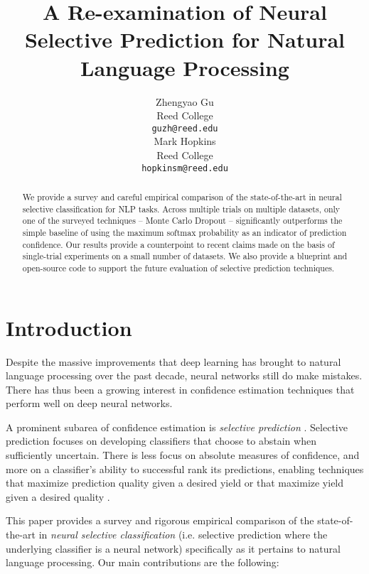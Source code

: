 \documentclass[11pt]{article}
\title{A Re-examination of Neural Selective Prediction for Natural Language Processing}
\author{Zhengyao Gu \\
  Reed College \\
  \texttt{guzh@reed.edu} \\\And
  Mark Hopkins \\
  Reed College \\
  \texttt{hopkinsm@reed.edu} \\}
\begin{document}
\maketitle
\begin{abstract}
We provide a survey and careful empirical comparison of the state-of-the-art in neural selective classification for NLP tasks. Across multiple trials on multiple datasets, only one of the surveyed techniques -- Monte Carlo Dropout -- significantly outperforms the simple baseline of using the maximum softmax probability as an indicator of prediction confidence. Our results provide a counterpoint to recent claims made on the basis of single-trial experiments on a small number of datasets. We also provide a blueprint and open-source code to support the future evaluation of selective prediction techniques. 
\end{abstract}

\section{Introduction}

Despite the massive improvements that deep learning has brought to natural language processing over the past decade, neural networks still do make mistakes. There has thus been a growing interest in confidence estimation techniques that perform well on deep neural networks. 

A prominent subarea of confidence estimation is \emph{selective prediction} \cite{el2010foundations,geifman2017selective}. Selective prediction focuses on developing classifiers that choose to abstain when sufficiently uncertain. There is less focus on absolute measures of confidence, and more on a classifier's ability to successful rank its predictions, enabling techniques that maximize prediction quality given a desired yield \cite{geifman2019selectivenet} or that maximize yield given a desired quality \cite{geifman2017selective}.  


This paper provides a survey and rigorous empirical comparison of the state-of-the-art in \emph{neural selective classification} (i.e. selective prediction where the underlying classifier is a neural network) specifically as it pertains to natural language processing. Our main contributions are the following:
\end{document}
